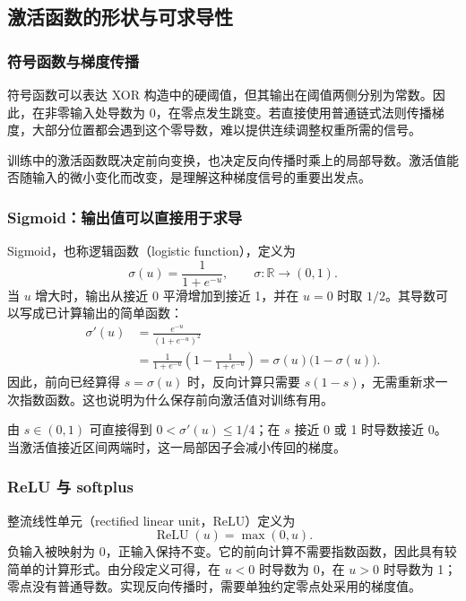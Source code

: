 \subsection{激活函数的形状与可求导性}

\subsubsection{符号函数与梯度传播}
符号函数可以表达 XOR 构造中的硬阈值，但其输出在阈值两侧分别为常数。因此，在非零输入处导数为 0，在零点发生跳变。若直接使用普通链式法则传播梯度，大部分位置都会遇到这个零导数，难以提供连续调整权重所需的信号。

训练中的激活函数既决定前向变换，也决定反向传播时乘上的局部导数。激活值能否随输入的微小变化而改变，是理解这种梯度信号的重要出发点。

\subsubsection{Sigmoid：输出值可以直接用于求导}
Sigmoid，也称逻辑函数（logistic function），定义为
\begin{equation}
 \sigma(u)=\frac{1}{1+e^{-u}},\qquad\sigma:\mathbb{R}\to(0,1).
 \label{l10:eq:sigmoid}
\end{equation}
当 $u$ 增大时，输出从接近 0 平滑增加到接近 1，并在 $u=0$ 时取 $1/2$。其导数可以写成已计算输出的简单函数：
\begin{align}
 \sigma'(u)
 &=\frac{e^{-u}}{(1+e^{-u})^2}\\
 &=\frac{1}{1+e^{-u}}\left(1-\frac{1}{1+e^{-u}}\right)
 =\sigma(u)\bigl(1-\sigma(u)\bigr).
 \label{l10:eq:sigmoid-prime}
\end{align}
因此，前向已经算得 $s=\sigma(u)$ 时，反向计算只需要 $s(1-s)$，无需重新求一次指数函数。这也说明为什么保存前向激活值对训练有用。

由 $s\in(0,1)$ 可直接得到 $0<\sigma'(u)\le1/4$；在 $s$ 接近 0 或 1 时导数接近 0。当激活值接近区间两端时，这一局部因子会减小传回的梯度。

\subsubsection{ReLU 与 softplus}
整流线性单元（rectified linear unit，ReLU）定义为
\begin{equation}
 \operatorname{ReLU}(u)=\max(0,u).
 \label{l10:eq:relu}
\end{equation}
负输入被映射为 0，正输入保持不变。它的前向计算不需要指数函数，因此具有较简单的计算形式。由分段定义可得，在 $u<0$ 时导数为 0，在 $u>0$ 时导数为 1；零点没有普通导数。实现反向传播时，需要单独约定零点处采用的梯度值。

